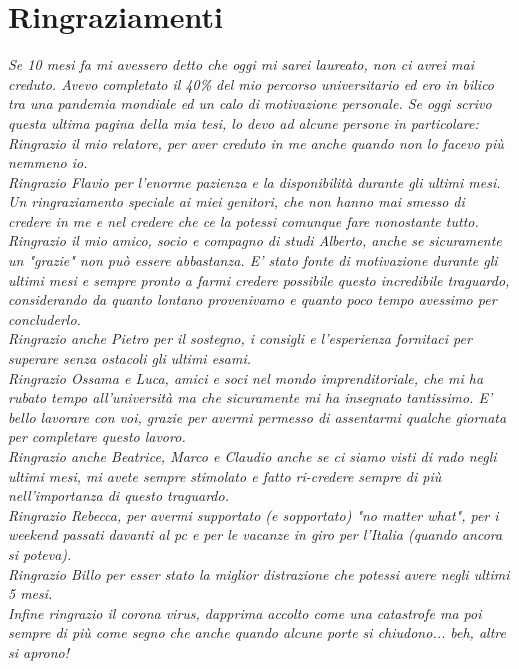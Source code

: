 \chapter*{Ringraziamenti}
\thispagestyle{empty}
\begin{flushright}
	\textit{Se 10 mesi fa mi avessero detto che oggi mi sarei laureato, non ci avrei mai creduto. Avevo completato il 40\% del mio percorso universitario ed ero in bilico tra una pandemia mondiale ed un calo di motivazione personale.
	Se oggi scrivo questa ultima pagina della mia tesi, lo devo ad alcune persone in particolare:\\	
		 Ringrazio il mio relatore, per aver creduto in me anche quando non lo facevo più nemmeno io.\\Ringrazio {\normalfont Flavio} per l'enorme pazienza e la disponibilità durante gli ultimi mesi.\\Un ringraziamento speciale ai miei genitori, che non hanno mai smesso di credere in me e nel credere che ce la potessi comunque fare nonostante tutto.\\
		 Ringrazio il mio amico, socio e compagno di studi {\normalfont Alberto}, anche se sicuramente un "grazie" non può essere abbastanza. E' stato fonte di motivazione durante gli ultimi mesi e sempre pronto a farmi credere possibile questo incredibile traguardo, considerando da quanto lontano provenivamo e quanto poco tempo avessimo per concluderlo.\\
		 Ringrazio anche {\normalfont Pietro} per il sostegno, i consigli e l'esperienza fornitaci per superare senza ostacoli gli ultimi esami.\\
		Ringrazio {\normalfont Ossama} e {\normalfont Luca}, amici e soci nel mondo imprenditoriale, che mi ha rubato tempo all'università ma che sicuramente mi ha insegnato tantissimo. E' bello lavorare con voi, grazie per avermi permesso di assentarmi qualche giornata per completare questo lavoro.\\
		Ringrazio anche {\normalfont Beatrice}, {\normalfont Marco} e {\normalfont Claudio} anche se ci siamo visti di rado negli ultimi mesi, mi avete sempre stimolato e fatto ri-credere sempre di più nell'importanza di questo traguardo.\\
		Ringrazio {\normalfont Rebecca}, per avermi supportato (e sopportato) "no matter what", per i weekend passati davanti al pc e per le vacanze in giro per l'Italia (quando ancora si poteva).\\
		Ringrazio {\normalfont Billo} per esser stato la miglior distrazione che potessi avere negli ultimi 5 mesi.\\
		Infine ringrazio il corona virus, dapprima accolto come una catastrofe ma poi sempre di più come segno che anche quando alcune porte si chiudono... beh, altre si aprono!}
\end{flushright}
